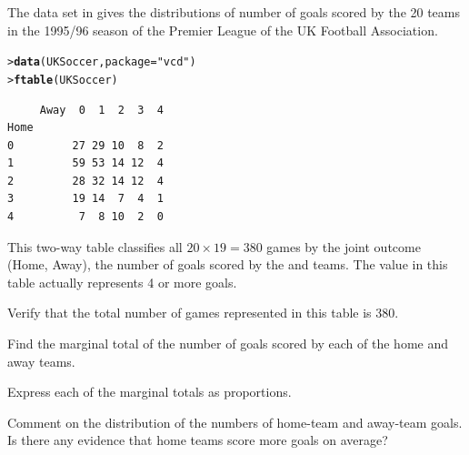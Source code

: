 \documentclass[10pt,krantz2]{krantz}\usepackage[]{graphicx}\usepackage[]{color}
\makeatletter
\newcommand{\hlstr}[1]{\textcolor[rgb]{0.192,0.494,0.8}{#1}}%
\newcommand{\hlstd}[1]{\textcolor[rgb]{0.345,0.345,0.345}{#1}}%
\newcommand{\hlkwc}[1]{\textcolor[rgb]{0.333,0.667,0.333}{#1}}%
\newcommand{\hlkwd}[1]{\textcolor[rgb]{0.737,0.353,0.396}{\textbf{#1}}}%
\newenvironment{kframe}{%
 \def\at@end@of@kframe{}%
 \ifinner\ifhmode%
  \def\at@end@of@kframe{\end{minipage}}%
  \begin{minipage}{\columnwidth}%
 \fi\fi%
 \def\FrameCommand##1{\hskip\@totalleftmargin \hskip-\fboxsep
 \colorbox{shadecolor}{##1}\hskip-\fboxsep
     \hskip-\linewidth \hskip-\@totalleftmargin \hskip\columnwidth}%
 \MakeFramed {\advance\hsize-\width
   \@totalleftmargin\z@ \linewidth\hsize
   \@setminipage}}%
 {\par\unskip\endMakeFramed%
 \at@end@of@kframe}
\newenvironment{knitrout}{}{} %
\renewenvironment{knitrout}{\small\renewcommand{\baselinestretch}{.85}}{} %
\makeatother
\begin{document}
\begin{Exercises}
\exercise The data set  in  gives the distributions of
number of goals scored by the 20 teams in the  1995/96 season of the
Premier League of the UK Football Association.
\begin{knitrout}
\color{fgcolor}\begin{kframe}
\begin{alltt}
\hlstd{> }\hlkwd{data}\hlstd{(UKSoccer,} \hlkwc{package}\hlstd{=}\hlstr{"vcd"}\hlstd{)}
\hlstd{> }\hlkwd{ftable}\hlstd{(UKSoccer)}
\end{alltt}
\begin{verbatim}
     Away  0  1  2  3  4
Home                    
0         27 29 10  8  2
1         59 53 14 12  4
2         28 32 14 12  4
3         19 14  7  4  1
4          7  8 10  2  0
\end{verbatim}
\end{kframe}
\end{knitrout}
This two-way table classifies all $20 \times 19 = 380$ games by the joint
outcome (Home, Away), the number of goals scored by the  and
 teams.
The value  in this table actually represents 4 or more goals.

  \begin{enumerate*}
    \item Verify that the total number of games represented in this table is 380.
    \item Find the marginal total of the number of goals scored by each of
    the home and away teams.
    \item Express each of the marginal totals as proportions.
    \item Comment on the distribution of the numbers of home-team and away-team
    goals.  Is there any evidence that home teams score more goals on average?

  \end{enumerate*}


\end{Exercises}
\end{document}
